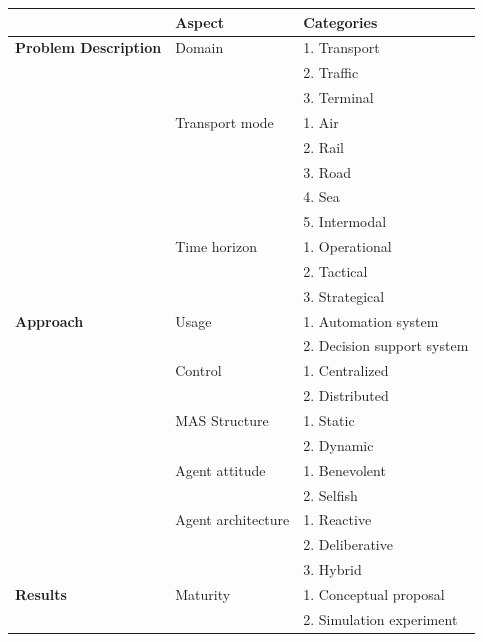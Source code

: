 \documentclass[11pt,letterpaper,onecolumn,twoside,openright,draft]{report}
\begin{document}
\begin{table}[htbp]
  \centering
    \begin{tabular}{|l|p{}|p{}|}
    \addlinespace
    \hline
          & \textbf{Aspect} & \textbf{Categories} \\
    \hline
    \hline
    \textbf{Problem Description} & Domain & 1. Transport \\
          &       & 2. Traffic \\
          &       & 3. Terminal \\
          \cline{2-3}
          & Transport mode & 1. Air \\
          &       & 2. Rail \\
          &       & 3. Road \\
          &       & 4. Sea \\
          &       & 5. Intermodal \\
          \cline{2-3}
          & Time horizon & 1. Operational \\
          &       & 2. Tactical \\
          &       & 3. Strategical \\
          \hline
    \textbf{Approach} & Usage & 1. Automation system \\
          &       & 2. Decision support system \\
          \cline{2-3}
          & Control & 1. Centralized \\
          &       & 2. Distributed \\
          \cline{2-3}
          & MAS Structure & 1. Static \\
          &       & 2. Dynamic \\
          \cline{2-3}
          & Agent attitude & 1. Benevolent \\
          &       & 2. Selfish \\
          \cline{2-3}
          & Agent architecture & 1. Reactive \\
          &       & 2. Deliberative \\
          &       & 3. Hybrid \\
          \hline
    \textbf{Results} & Maturity & 1. Conceptual proposal \\
          &       & 2. Simulation experiment \\

\end{tabular}
\end{table}
\end{document}
